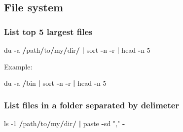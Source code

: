 \documentclass[openany]{book}
\newenvironment{Shaded}{\begin{snugshade}}{\end{snugshade}}
\newcommand{\DecValTok}[1]{\textcolor[rgb]{0.00,0.00,0.81}{#1}}
\newcommand{\ErrorTok}[1]{\textcolor[rgb]{0.64,0.00,0.00}{\textbf{#1}}}
\newcommand{\NormalTok}[1]{#1}
\newcommand{\OperatorTok}[1]{\textcolor[rgb]{0.81,0.36,0.00}{\textbf{#1}}}
\newcommand{\StringTok}[1]{\textcolor[rgb]{0.31,0.60,0.02}{#1}}
\begin{document}
\hypertarget{file-system}{%
\subsection{File system}\label{file-system}}

\hypertarget{list-top-5-largest-files}{%
\subsubsection{List top 5 largest files}\label{list-top-5-largest-files}}

\begin{Shaded}
\begin{Highlighting}[]
\NormalTok{du }\OperatorTok{-}\NormalTok{a }\OperatorTok{/}\NormalTok{path}\OperatorTok{/}\NormalTok{to}\OperatorTok{/}\NormalTok{my}\OperatorTok{/}\NormalTok{dir}\OperatorTok{/}\StringTok{ }\ErrorTok{|}\StringTok{ }\NormalTok{sort }\OperatorTok{-}\NormalTok{n }\OperatorTok{-}\NormalTok{r }\OperatorTok{|}\StringTok{ }\NormalTok{head }\OperatorTok{-}\NormalTok{n }\DecValTok{5}
\end{Highlighting}
\end{Shaded}

Example:

\begin{Shaded}
\begin{Highlighting}[]
\NormalTok{du }\OperatorTok{-}\NormalTok{a }\OperatorTok{/}\NormalTok{bin }\OperatorTok{|}\StringTok{ }\NormalTok{sort }\OperatorTok{-}\NormalTok{n }\OperatorTok{-}\NormalTok{r }\OperatorTok{|}\StringTok{ }\NormalTok{head }\OperatorTok{-}\NormalTok{n }\DecValTok{5}
\end{Highlighting}
\end{Shaded}

\hypertarget{list-files-in-a-folder-separated-by-delimeter}{%
\subsubsection{List files in a folder separated by delimeter}\label{list-files-in-a-folder-separated-by-delimeter}}

\begin{Shaded}
\begin{Highlighting}[]
\NormalTok{ls }\DecValTok{-1} \OperatorTok{/}\NormalTok{path}\OperatorTok{/}\NormalTok{to}\OperatorTok{/}\NormalTok{my}\OperatorTok{/}\NormalTok{dir}\OperatorTok{/}\StringTok{ }\ErrorTok{|}\StringTok{ }\NormalTok{paste }\OperatorTok{-}\NormalTok{sd }\StringTok{","} \OperatorTok{-}
\end{Highlighting}
\end{Shaded}
\end{document}
